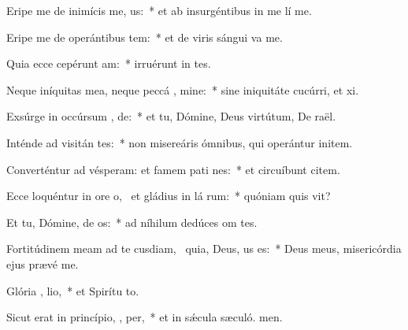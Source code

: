 \item Eripe me de inimícis me,  us:~* et ab insurgéntibus in me lí me.
\item Eripe me de operántibus tem:~* et de viris sángui va me.
\item Quia ecce cepérunt  am:~* irruérunt in  tes.
\item Neque iníquitas mea, neque peccá , mine:~* sine iniquitáte cucúrri, et xi.
\item Exsúrge in occúrsum ,  de:~* et tu, Dómine, Deus virtútum, De raël.
\item Inténde ad visitán  tes:~* non misereáris ómnibus, qui operántur initem.
\item Converténtur ad vésperam: et famem pati  nes:~* et circuíbunt citem.
\item Ecce loquéntur in ore o,~\pscross{} et gládius in lá rum:~* quóniam quis vit?
\item Et tu, Dómine, de os:~* ad níhilum dedúces om tes.
\item Fortitúdinem meam ad te cusdiam,~\pscross{} quia, Deus,  us es:~* Deus meus, misericórdia ejus prævé me.
\item Glória ,  lio,~* et Spirítu to.
\item Sicut erat in princípio,  ,  per,~* et in sǽcula sæculó. men.
